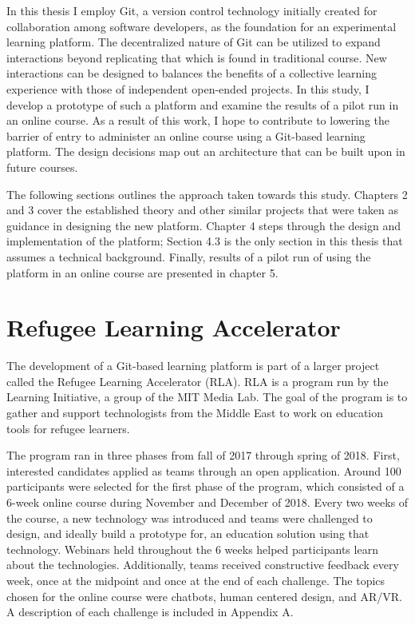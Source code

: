\documentclass[12pt,twoside,vi]{mitthesis}
\begin{document}
In this thesis I employ Git, a version control technology initially created for collaboration among software developers, as the foundation for an experimental learning platform. The decentralized nature of Git can be utilized to expand interactions beyond replicating that which is found in traditional course. New interactions can be designed to balances the benefits of a collective learning experience with those of independent open-ended projects. In this study, I develop a prototype of such a platform and examine the results of a pilot run in an online course. As a result of this work, I hope to contribute to lowering the barrier of entry to administer an online course using a Git-based learning platform. The design decisions map out an architecture that can be built upon in future courses. 

The following sections outlines the approach taken towards this study. Chapters 2 and 3 cover the established theory and other similar projects that were taken as guidance in designing the new platform. Chapter 4 steps through the design and implementation of the platform; Section 4.3 is the only section in this thesis that assumes a technical background. Finally, results of a pilot run of using the platform in an online course are presented in chapter 5. 

\section{Refugee Learning Accelerator}

The development of a Git-based learning platform is part of a larger project called the Refugee Learning Accelerator (RLA). RLA is a program run by the Learning Initiative, a group of the MIT Media Lab. The goal of the program is to gather and support technologists from the Middle East to work on education tools for refugee learners. 

The program ran in three phases from fall of 2017 through spring of 2018. First, interested candidates applied as teams through an open application. Around 100 participants were selected for the first phase of the program, which consisted of a 6-week online course during November and December of 2018. Every two weeks of the course, a new technology was introduced and teams were challenged to design, and ideally build a prototype for, an education solution using that technology. Webinars held throughout the 6 weeks helped participants learn about the technologies. Additionally, teams received constructive feedback every week, once at the midpoint and once at the end of each challenge. The topics chosen for the online course were chatbots, human centered design, and AR/VR. A description of each challenge is included in Appendix A.
\end{document}
